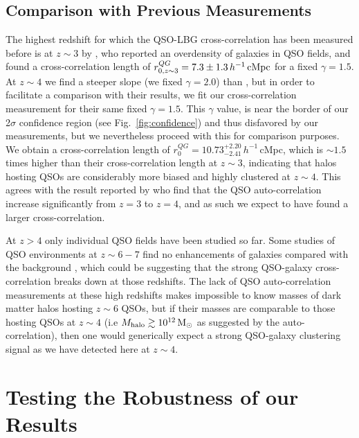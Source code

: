 \documentclass[iop, revtex4]{emulateapj}
\begin{document}
\subsection{Comparison with Previous Measurements}
\label{sec:disc}

The highest redshift for which the QSO-LBG cross-correlation has been measured
before is at $z\sim3$ by \citet{Trainor12}, who reported an overdensity of galaxies in QSO fields, and found
a cross-correlation length 
of $r^{QG}_{0, z\sim3}= 7.3\pm1.3 \,h^{-1}\,{\rm cMpc}$ for
a fixed $\gamma=1.5$. 
At $z\sim 4$ we find a steeper slope (we fixed $\gamma=2.0$)
than \citet{Trainor12}, but in order to facilitate a comparison with their results, we fit our cross-correlation measurement
for their same fixed $\gamma=1.5$. This $\gamma$ value, is near the border of our 2$\sigma$
confidence region (see Fig.~\ref{fig:confidence}) and thus disfavored by our measurements, but
we nevertheless proceed with this for comparison purposes. We obtain a cross-correlation length of
$r^{QG}_{0}=10.73^{+2.20}_{-2.41}\,h^{-1}$\,cMpc, which is $\sim1.5$
times higher than their cross-correlation length at $z\sim3$, 
indicating that halos hosting QSOs 
are considerably more biased and highly clustered at $z\sim4$.
 This agrees with the result reported by \citet{Shen07} who find that the
 QSO auto-correlation increase significantly from $z = 3$ to $z = 4$,
  and as such we expect to have found a larger cross-correlation. 

At $z>4$ only individual QSO fields have been studied so far. Some studies of QSO environments at
$z\sim6-7$
find no enhancements of galaxies compared with the background \citep[e.g ][]{Willott05, Banados13, Simpson14, Mazzucchelli16},
which could be suggesting that the strong QSO-galaxy cross-correlation breaks down at those redshifts. The lack of QSO auto-correlation measurements at these high redshifts makes impossible to know masses
of dark matter halos hosting $z\sim 6$ QSOs, but if their masses
are comparable to those hosting QSOs at $z\sim4$ (i.e $M_{\rm halo} \gtrsim 10^{12}\,\rm M_{\odot}$ as suggested
by the \citealt{Shen07} auto-correlation), then one would generically expect a strong QSO-galaxy clustering
signal  as we have detected here at $z\sim 4$.

\section{Testing the Robustness of our Results}
\label{sec:testing}
\end{document}
